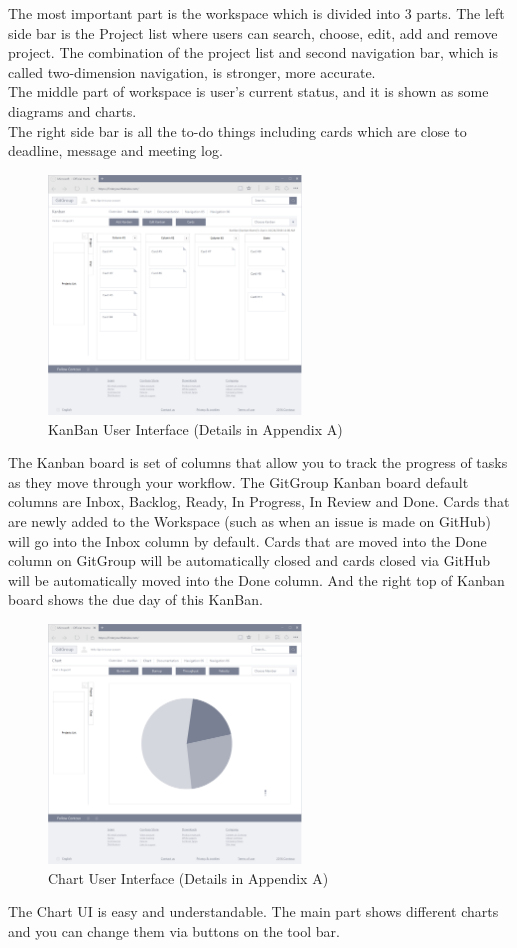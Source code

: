 \documentclass[12pt,a4paper]{report}
\begin{document}
The most important part is the workspace which is divided into 3 parts. The left side bar is the Project list where users can search, choose, edit, add and remove project. The combination of the project list and second navigation bar, which is called two-dimension navigation, is stronger, more accurate. \\
The middle part of workspace is user's current status, and it is shown as some diagrams and charts.\\
The right side bar is all the to-do things including cards which are close to deadline, message and meeting log.\\
\begin{figure}[H]
	\centering
	\includegraphics[width=0.6\textwidth]{./pics/KanbanInterface.png}
	\caption{KanBan User Interface (Details in Appendix A)}
\end{figure}
The Kanban board is set of columns that allow you to track the progress of tasks as they move through your workflow. The GitGroup Kanban board default columns are Inbox, Backlog, Ready, In Progress, In Review and Done. Cards that are newly added to the Workspace (such as when an issue is made on GitHub) will go into the Inbox column by default. Cards that are moved into the Done column on GitGroup will be automatically closed and cards closed via GitHub will be automatically moved into the Done column. And the right top of Kanban board shows the due day of this KanBan. 
\begin{figure}[H]
	\centering
	\includegraphics[width=0.6\textwidth]{./pics/ChartInterface.png}
	\caption{Chart User Interface (Details in Appendix A)}
\end{figure}
The Chart UI is easy and understandable. The main part shows different charts and you can change them via buttons on the tool bar.
\end{document}
